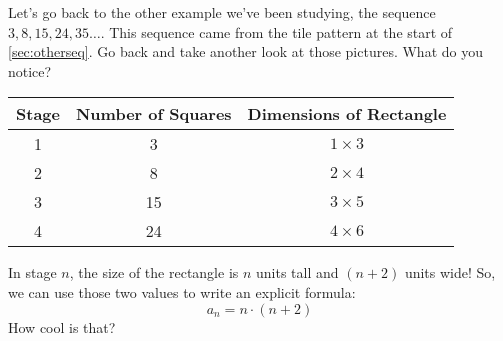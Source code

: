 Let's go back to the other example we've been studying, the sequence $3, 8, 15, 24, 35\dotsc$. This sequence came from the tile pattern at the start of \cref{sec:otherseq}. Go back and take another look at those pictures. What do you notice?

\begin{center}
\begin{tabular}{c|c|c}
Stage		& Number of Squares		& Dimensions of Rectangle	\\\hline
1			& 3							& $1 \times 3$		\\
2			& 8							& $2 \times 4$		\\
3			& 15						& $3 \times 5$		\\
4			& 24						& $4 \times 6$		\\
\end{tabular}
\end{center}
\medskip

In stage $n$, the size of the rectangle is $n$ units tall and $(n+2)$ units wide! So, we can use those two values to write an explicit formula: \[a_n = n \cdot (n+2)\] How cool is that?

